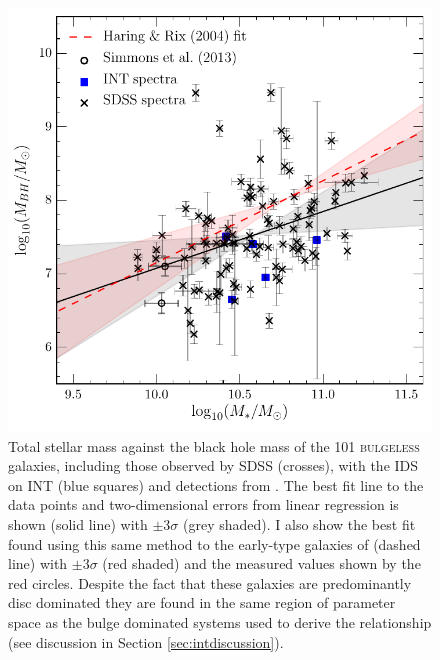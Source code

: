 {\begin{figure}
\centering
\includegraphics[width=\textwidth]{agn/mass_bh_total_mass_fit_linmix_fit.pdf}
\caption[Black hole stellar mass relation for the \textsc{bulgeless} sample]{Total stellar mass against the black hole mass of the 101 \textsc{bulgeless} galaxies, including those observed by SDSS (crosses), with the IDS on INT (blue squares) and detections from \citet[open cirlces]{Simmons13}. The best fit line to the data points and two-dimensional errors from linear regression is shown (solid line) with $\pm3\sigma$ (grey shaded). I also show the best fit found using this same method to the early-type galaxies of \citet{haringrix04} (dashed line) with $\pm3\sigma$ (red shaded) and the measured values shown by the red circles. Despite the fact that these galaxies are predominantly disc dominated they are found in the same region of parameter space as the bulge dominated systems used to derive the \citet{haringrix04} relationship (see discussion in Section \ref{sec:intdiscussion}).
}
\label{fig:totvsbh}
\end{figure}

}
